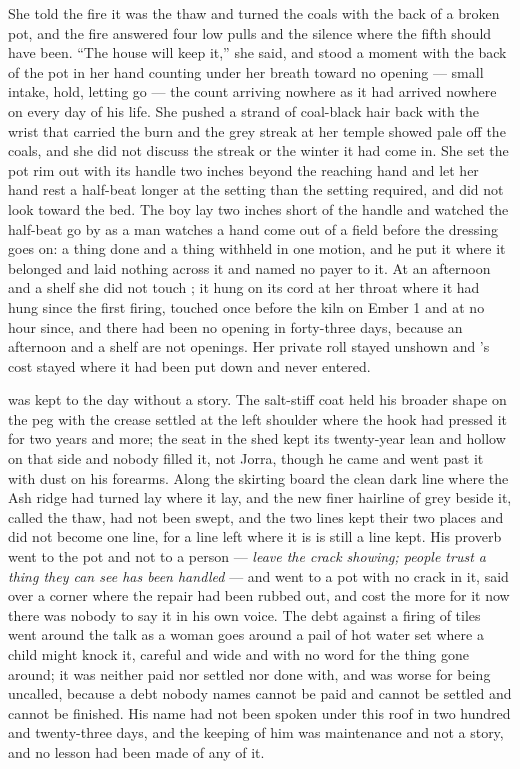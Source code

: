 She told the fire it was the thaw and turned the coals with the back of a broken pot, and the fire answered four low pulls and the silence where the fifth should have been. “The house will keep it,” she said, and stood a moment with the back of the pot in her hand counting under her breath toward no opening --- small intake, hold, letting go --- the count arriving nowhere as it had arrived nowhere on every day of his life. She pushed a strand of coal-black hair back with the wrist that carried the burn and the grey streak at her temple showed pale off the coals, and she did not discuss the streak or the winter it had come in. She set the pot rim out with its handle two inches beyond the reaching hand and let her hand rest a half-beat longer at the setting than the setting required, and did not look toward the bed. The boy lay two inches short of the handle and watched the half-beat go by as a man watches a hand come out of a field before the dressing goes on: a thing done and a thing withheld in one motion, and he put it where it belonged and laid nothing across it and named no payer to it. At an afternoon and a shelf she did not touch ; it hung on its cord at her throat where it had hung since the first firing, touched once before the kiln on Ember 1 and at no hour since, and there had been no opening in forty-three days, because an afternoon and a shelf are not openings. Her private roll stayed unshown and 's cost stayed where it had been put down and never entered.

 was kept to the day without a story. The salt-stiff coat held his broader shape on the peg with the crease settled at the left shoulder where the hook had pressed it for two years and more; the seat in the shed kept its twenty-year lean and hollow on that side and nobody filled it, not Jorra, though he came and went past it with dust on his forearms. Along the skirting board the clean dark line where the Ash ridge had turned lay where it lay, and the new finer hairline of grey beside it, called the thaw, had not been swept, and the two lines kept their two places and did not become one line, for a line left where it is is still a line kept. His proverb went to the pot and not to a person --- \emph{leave the crack showing; people trust a thing they can see has been handled} --- and went to a pot with no crack in it, said over a corner where the repair had been rubbed out, and cost the more for it now there was nobody to say it in his own voice. The debt against a firing of tiles went around the talk as a woman goes around a pail of hot water set where a child might knock it, careful and wide and with no word for the thing gone around; it was neither paid nor settled nor done with, and was worse for being uncalled, because a debt nobody names cannot be paid and cannot be settled and cannot be finished. His name had not been spoken under this roof in two hundred and twenty-three days, and the keeping of him was maintenance and not a story, and no lesson had been made of any of it.

